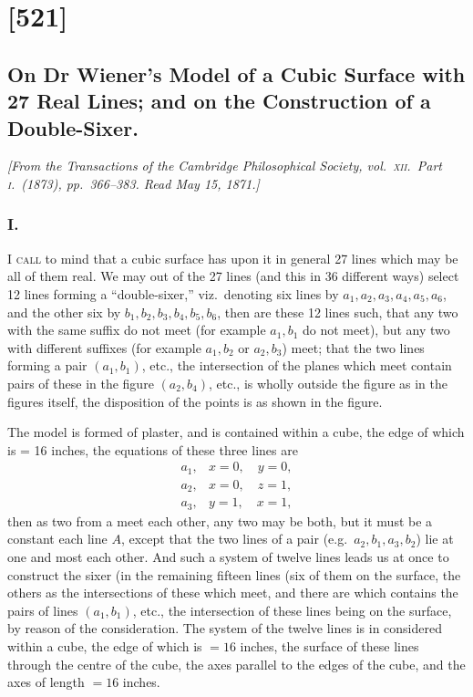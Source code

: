 \documentclass[11pt,a4paper]{article}
\theoremstyle{plain}
\theoremstyle{definition}
\begin{document}
\clearpage

\section{[521]}
\subsection{On Dr Wiener's Model of a Cubic Surface with 27 Real Lines; and on the Construction of a Double-Sixer.}

\begin{center}
\textit{[From the Transactions of the Cambridge Philosophical Society, vol.\ \textsc{xii}.\ Part \textsc{i}.\ (1873), pp.\ 366--383. Read May 15, 1871.]}
\end{center}

\subsubsection*{I.}

\textsc{I call} to mind that a cubic surface has upon it in general 27 lines which may be all of them real. We may out of the 27 lines (and this in 36 different ways) select 12 lines forming a ``double-sixer,'' viz.\ denoting six lines by $a_1, a_2, a_3, a_4, a_5, a_6$, and the other six by $b_1, b_2, b_3, b_4, b_5, b_6$, then are these 12 lines such, that any two with the same suffix do not meet (for example $a_1, b_1$ do not meet), but any two with different suffixes (for example $a_1, b_2$ or $a_2, b_3$) meet; that the two lines forming a pair $(a_1, b_1)$, etc., the intersection of the planes which meet contain pairs of these in the figure $(a_2, b_4)$, etc., is wholly outside the figure as in the figures itself, the disposition of the points is as shown in the figure.

The model is formed of plaster, and is contained within a cube, the edge of which is = 16 inches, the equations of these three lines are
\begin{align*}
a_1, & x = 0, \quad y = 0,\\
a_2, & x = 0, \quad z = 1,\\
a_3, & y = 1, \quad x = 1,
\end{align*}
then as two from a meet each other, any two may be both, but it must be a constant each line $A$, except that the two lines of a pair (e.g.\ $a_2, b_1, a_3, b_2$) lie at one and most each other. And such a system of twelve lines leads us at once to construct the sixer (in the remaining fifteen lines (six of them on the surface, the others as the intersections of these which meet, and there are which contains the pairs of lines $(a_1, b_1)$, etc., the intersection of these lines being on the surface, by reason of the consideration. The system of the twelve lines is in considered within a cube, the edge of which is $= 16$ inches, the surface of these lines through the centre of the cube, the axes parallel to the edges of the cube, and the axes of length $= 16$ inches.
\end{document}
